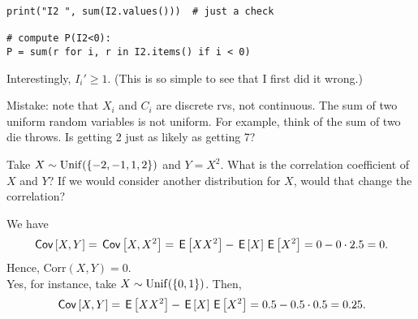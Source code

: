 \begin{exercise}
\begin{solution}
\begin{verbatim}
print("I2 ", sum(I2.values()))  # just a check

# compute P(I2<0):
P = sum(r for i, r in I2.items() if i < 0)
\end{verbatim}

Interestingly, $I_{i}'\geq 1$. (This is so simple to see that I first did it wrong.)



Mistake: note that $X_{i}$   and $C_{i}$ are discrete rvs, not continuous.
The sum of two uniform random variables is not uniform. For example, think of the sum of two die throws. Is getting 2 just as likely as getting 7?
\end{solution}
\end{exercise}





\begin{exercise}
Take $X\sim\mathrm{Unif}(\{-2, -1, 1, 2\})$ and $Y= X^2$. What is the correlation coefficient of $X$ and $Y$?
If we would consider another distribution for $X$, would that change the correlation?
\begin{solution}
We have
\begin{align}
    \,\mathsf{Cov}\left[X,Y\right] = \,\mathsf{Cov}\left[X,X^2\right] = \,\mathsf{E}\left[XX^2\right] - \,\mathsf{E}\left[X\right]\,\mathsf{E}\left[X^2\right] = 0 - 0\cdot 2.5 = 0.
\end{align}
Hence, $\text{Corr}(X,Y) = 0$. \\
Yes, for instance, take $X \sim \mathrm{Unif}(\{0,1\})$. Then,
\begin{align}
    \,\mathsf{Cov}\left[X,Y\right] = \,\mathsf{E}\left[XX^2\right] - \,\mathsf{E}\left[X\right]\,\mathsf{E}\left[X^2\right] = 0.5 - 0.5\cdot 0.5 = 0.25.
\end{align}
\end{solution}
\end{exercise}



